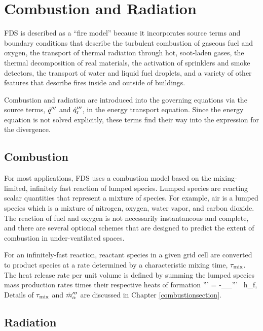 \section{Combustion and Radiation}

FDS is described as a ``fire model'' because it incorporates source terms and boundary conditions that describe the
turbulent combustion of gaseous fuel and oxygen, the transport of thermal radiation through hot, soot-laden gases, the
thermal decomposition of real materials, the activation of sprinklers and smoke detectors, the transport of water and liquid fuel
droplets, and a variety of other features that describe fires inside and outside of buildings.

Combustion and radiation are introduced into the governing equations via the source terms, $\dot{q}^{\prime\prime\prime}$ and $\dot{q}_{\rm r}^{\prime\prime\prime}$,
in the energy transport equation. Since the energy equation is not solved explicitly, these terms find their way into the
expression for the divergence.

\subsection{Combustion}

For most applications, FDS uses a combustion model based on the mixing-limited, infinitely fast reaction of lumped species.
Lumped species are reacting scalar quantities that represent a mixture of species.  For example, air is a lumped species which is a mixture of
nitrogen, oxygen, water vapor, and carbon dioxide.  The reaction of fuel and oxygen is not necessarily instantaneous and
complete, and there are several optional schemes that are designed to predict the extent of combustion in under-ventilated spaces.

For an infinitely-fast reaction, reactant species in a given grid cell are converted to product species at a rate determined by a
characteristic mixing time, $\tau_{\rm mix}$. The heat release rate per unit volume is defined by summing the lumped species mass production rates times their respective heats of formation
\be
   \dq''' = -\sum_\alpha \dm_\alpha''' \, \Delta h_{\rm f,\alpha} \label{EDC1}
\ee  %
Details of $\tau_{\rm mix}$ and $\dot{m}_\alpha'''$ are discussed in Chapter \ref{combustionsection}.

\subsection{Radiation}

